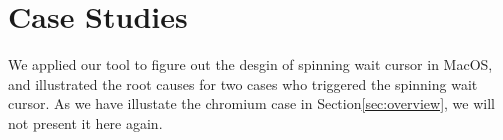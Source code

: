 \section{Case Studies} \label{sec:casestudy}
We applied our tool to figure out the desgin of spinning wait cursor in MacOS,
and illustrated the root causes for two cases who triggered the spinning wait cursor.
As we have illustate the chromium case in Section\ref{sec:overview}, we will not
present it here again.








